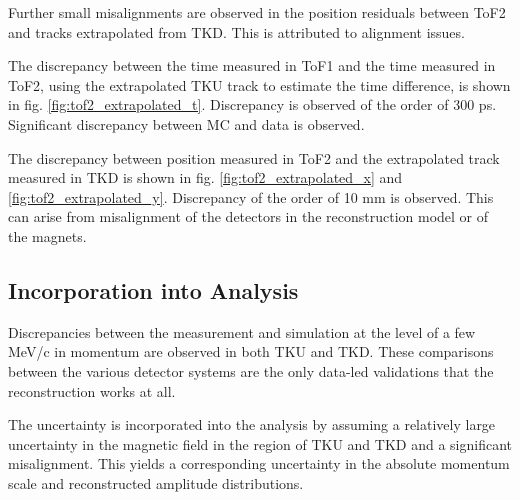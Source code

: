 Further small misalignments are observed in the position residuals between ToF2
and tracks extrapolated from TKD. This is attributed to alignment issues.

The discrepancy between the time measured in ToF1 and the time measured in 
ToF2, using the extrapolated TKU track to estimate the time difference, is shown
in fig. \ref{fig:tof2_extrapolated_t}. Discrepancy is observed of the order of
300 ps. Significant discrepancy between MC and data is observed.

The discrepancy between position measured in ToF2 and the extrapolated track
measured in TKD is shown in fig. \ref{fig:tof2_extrapolated_x} and 
\ref{fig:tof2_extrapolated_y}. Discrepancy of the order of 10 mm is observed.
This can arise from misalignment of the detectors in the reconstruction model or
of the magnets.

\subsection{Incorporation into Analysis}
Discrepancies between the measurement and simulation at the level of a few MeV/c
in momentum are observed in both TKU and TKD. These comparisons between the 
various detector systems are the only data-led validations that the 
reconstruction works at all.

The uncertainty is incorporated into the analysis by 
assuming a relatively large uncertainty in the magnetic field in the region of 
TKU and TKD and a significant misalignment. This yields a corresponding 
uncertainty in the absolute momentum scale and reconstructed amplitude 
distributions.

